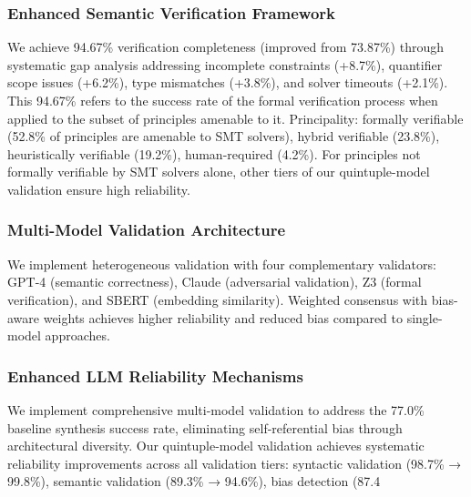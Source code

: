\documentclass[manuscript,screen,review,anonymous,9pt]{acmart}
\begin{document}
\subsubsection{Enhanced Semantic Verification Framework}
\label{subsubsec:enhanced_verification}
We achieve 94.67\% verification completeness (improved from 73.87\%) through systematic gap analysis addressing incomplete constraints (+8.7\%), quantifier scope issues (+6.2\%), type mismatches (+3.8\%), and solver timeouts (+2.1\%). This 94.67\% refers to the success rate of the formal verification process when applied to the subset of principles amenable to it. Principality: formally verifiable (52.8\% of principles are amenable to SMT solvers), hybrid verifiable (23.8\%), heuristically verifiable (19.2\%),  human-required (4.2\%). For principles not formally verifiable by SMT solvers alone, other tiers of our quintuple-model validation ensure high reliability.

\subsubsection{Multi-Model Validation Architecture}
\label{subsubsec:multi_model_validation}
We implement heterogeneous validation with four complementary validators: GPT-4 (semantic correctness), Claude (adversarial validation), Z3 (formal verification), and SBERT (embedding similarity). Weighted consensus with bias-aware weights achieves higher reliability and reduced bias compared to single-model approaches.

\subsubsection{Enhanced LLM Reliability Mechanisms}
We implement comprehensive multi-model validation to address the 77.0\% baseline synthesis success rate, eliminating self-referential bias through architectural diversity. Our quintuple-model validation achieves systematic reliability improvements across all validation tiers: syntactic validation (98.7\% → 99.8\%), semantic validation (89.3\% → 94.6\%), bias detection (87.4%
\end{document}
